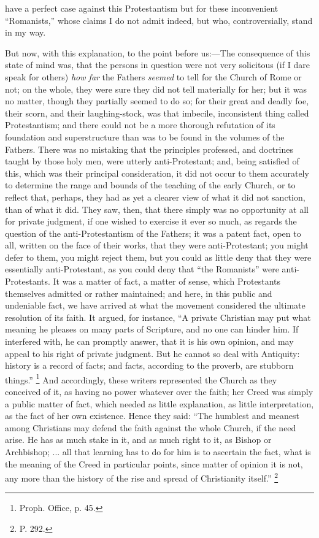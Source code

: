 have a perfect case against this Protestantism but for these
inconvenient ``Romanists,'' whose claims I do not admit
indeed, but who, controversially, stand in my way.

But now, with this explanation, to the point before us:—The
consequence of this state of mind was, that the persons in question
were not very solicitous (if I dare speak for others) \emph{how far} the
Fathers \emph{seemed} to tell for the Church of Rome or not; on the whole,
they were sure they did not tell materially for her; but it was no
matter, though they partially seemed to do so; for their great and
deadly foe, their scorn, and their laughing-stock, was that imbecile,
inconsistent thing called Protestantism; and there could not be a more
thorough refutation of its foundation and superstructure than was to
be found in the volumes of the Fathers. There was no mistaking that
the principles professed, and doctrines taught by those holy men, were
utterly anti-Protestant; and, being satisfied of this, which was their
principal consideration, it did not occur to them accurately to
determine the range and bounds of the teaching of the early Church, or
to reflect that, perhaps, they had as yet a clearer view of what it
did not sanction, than of what it did. They saw, then, that there
simply was no opportunity at all for private judgment, if one wished
to exercise it ever so much, as regards the question of the
anti-Protestantism of the Fathers; it was a patent fact, open to all,
written on the face of their works, that they were anti-Protestant;
you might defer to them, you might reject them, but you could as
little deny that they were essentially anti-Protestant, as you could
deny that ``the Romanists'' were anti-Protestants. It was a
matter of fact, a matter of sense, which Protestants themselves
admitted or rather maintained; and here, in this public and undeniable
fact, we have arrived at what the movement considered the ultimate
resolution of its faith. It argued, for instance, ``A private
Christian may put what meaning he pleases on many parts of Scripture,
and no one can hinder him. If interfered with, he can promptly answer,
that it is his own opinion, and may appeal to his right of private
judgment. But he cannot so deal with Antiquity: history is a record of
facts; and facts, according to the proverb, are stubborn things.''
\footnote{Proph. Office, p. 45.} And accordingly, these
writers represented the Church as they conceived of it, as having no
power whatever over the faith; her Creed was simply a public matter of
fact, which needed as little explanation, as little interpretation, as
the fact of her own existence. Hence they said: ``The humblest and
meanest among Christians may defend the faith against the whole
Church, if the need arise. He has as much stake in it, and as much
right to it, as Bishop or Archbishop; ... all that learning has to do
for him is to ascertain the fact, what is the meaning of the Creed in
particular points, since matter of opinion it is not, any more than
the history of the rise and spread of Christianity itself.'' \footnote{P. 292.}

